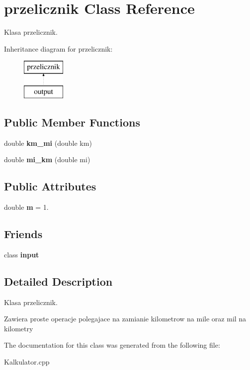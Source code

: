 \hypertarget{classprzelicznik}{\section{przelicznik Class Reference}
\label{classprzelicznik}
}


Klasa przelicznik.  


Inheritance diagram for przelicznik\+:\begin{figure}[H]
\begin{center}
\leavevmode
\includegraphics[height=2.000000cm]{classprzelicznik}
\end{center}
\end{figure}
\subsection*{Public Member Functions}
\begin{DoxyCompactItemize}
\item 
\hypertarget{classprzelicznik_af16918bffe6d4e2e45a498a9bb4d7344}{double {\bfseries km\+\_\+mi} (double km)}\label{classprzelicznik_af16918bffe6d4e2e45a498a9bb4d7344}

\item 
\hypertarget{classprzelicznik_a5892f14824367d5a5afe25e01b68fe13}{double {\bfseries mi\+\_\+km} (double mi)}\label{classprzelicznik_a5892f14824367d5a5afe25e01b68fe13}

\end{DoxyCompactItemize}
\subsection*{Public Attributes}
\begin{DoxyCompactItemize}
\item 
\hypertarget{classprzelicznik_acccf8fd1a56dabc8f58237eff8144e36}{double {\bfseries m} = 1.}\label{classprzelicznik_acccf8fd1a56dabc8f58237eff8144e36}

\end{DoxyCompactItemize}
\subsection*{Friends}
\begin{DoxyCompactItemize}
\item 
\hypertarget{classprzelicznik_a0a8814941837a9542fbb768e740fd03b}{class {\bfseries input}}\label{classprzelicznik_a0a8814941837a9542fbb768e740fd03b}

\end{DoxyCompactItemize}


\subsection{Detailed Description}
Klasa przelicznik. 

Zawiera proste operacje polegajace na zamianie kilometrow na mile oraz mil na kilometry 

The documentation for this class was generated from the following file\+:\begin{DoxyCompactItemize}
\item 
Kalkulator.\+cpp\end{DoxyCompactItemize}
